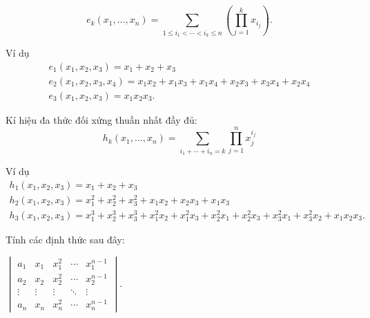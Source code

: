 \documentclass[class=nhvh-linear-algebra,crop=false]{standalone}
\begin{document}
\[
    e_{k}(x_{1}, \ldots, x_{n}) = \sum_{1\le i_{1} < \cdots < i_{k} \le n}\left(\prod^{k}_{j=1}x_{i_{j}}\right).
\]

\par Ví dụ
\begin{gather*}
    e_{1}(x_{1}, x_{2}, x_{3}) = x_{1} + x_{2} + x_{3} \\
    e_{2}(x_{1}, x_{2}, x_{3}, x_{4}) = x_{1}x_{2} + x_{1}x_{3} + x_{1}x_{4} + x_{2}x_{3} + x_{3}x_{4} + x_{2}x_{4} \\
    e_{3}(x_{1}, x_{2}, x_{3}) = x_{1}x_{2}x_{3}.
\end{gather*}

\par Kí hiệu đa thức đối xứng thuần nhất đầy đủ:
\[
    h_{k}(x_{1}, \ldots, x_{n}) = \sum_{i_{1}+\cdots+i_{n}=k}\prod^{n}_{j=1}x^{i_{j}}_{j}
\]

\par Ví dụ
\begin{gather*}
    h_{1}(x_{1}, x_{2}, x_{3}) = x_{1} + x_{2} + x_{3} \\
    h_{2}(x_{1}, x_{2}, x_{3}) = x_{1}^{2} + x_{2}^{2} + x_{3}^{2} + x_{1}x_{2} + x_{2}x_{3} + x_{1}x_{3} \\
    h_{3}(x_{1}, x_{2}, x_{3}) = x_{1}^{3} + x_{2}^{3} + x_{3}^{3} + x_{1}^{2}x_{2} + x_{1}^{2}x_{3} + x_{2}^{2}x_{1} + x_{2}^{2}x_{3} + x_{3}^{2}x_{1} + x_{3}^{2}x_{2} + x_{1}x_{2}x_{3}.
\end{gather*}

\par Tính các định thức sau đây:

\begin{exercise}
    $\begin{vmatrix}
            a_{1}  & x_{1}  & x_{1}^{2} & \cdots & x_{1}^{n-1} \\
            a_{2}  & x_{2}  & x_{2}^{2} & \cdots & x_{2}^{n-1} \\
            \vdots & \vdots & \vdots    & \ddots & \vdots      \\
            a_{n}  & x_{n}  & x_{n}^{2} & \cdots & x_{n}^{n-1}
        \end{vmatrix}$.
\end{exercise}
\end{document}
